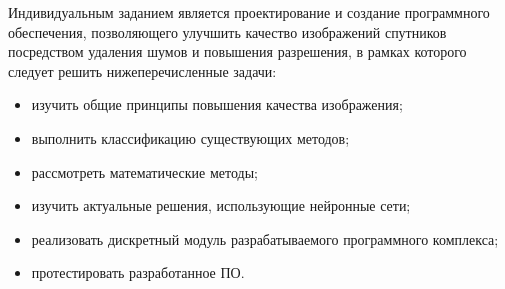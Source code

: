 Индивидуальным заданием является проектирование и создание программного обеспечения, позволяющего улучшить качество изображений спутников посредством удаления шумов и повышения разрешения, в рамках которого следует решить нижеперечисленные задачи:

\begin{itemize}
	\item изучить общие принципы повышения качества изображения;
	\item выполнить классификацию существующих методов;
	\item рассмотреть математические методы;
	\item изучить актуальные решения, использующие нейронные сети;
	\item реализовать дискретный модуль разрабатываемого программного комплекса;
	\item протестировать разработанное ПО.
\end{itemize}





